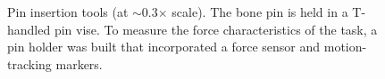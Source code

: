\begin{figure}%
\centering
{}%
\hspace{42pt}%
\captionsetup[subfigure]{justification=RaggedRight,singlelinecheck=false}%
%
\caption[Pin insertion tools]{%
  Pin insertion tools (at \ensuremath{\sim}0.3\ensuremath{\times} scale).  The bone pin is held in a T-handled pin vise.  To measure the force characteristics of the task, a pin holder was built that incorporated a force sensor and motion-tracking markers.%
}%
\label{fig:pinHolders}%
\end{figure}

